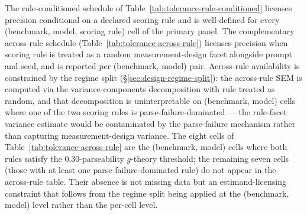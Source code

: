 \documentclass[11pt]{article}
\begin{document}
The rule-conditioned schedule of Table~\ref{tab:tolerance-rule-conditioned} licenses precision conditional on a declared scoring rule and is well-defined for every (benchmark, model, scoring rule) cell of the primary panel. The complementary across-rule schedule (Table~\ref{tab:tolerance-across-rule}) licenses precision when scoring rule is treated as a random measurement-design facet alongside prompt and seed, and is reported per (benchmark, model) pair. Across-rule availability is constrained by the regime split (§\ref{sec:design-regime-split}): the across-rule SEM is computed via the variance-components decomposition with rule treated as random, and that decomposition is uninterpretable on (benchmark, model) cells where one of the two scoring rules is parse-failure-dominated --- the rule-facet variance estimate would be contaminated by the parse-failure mechanism rather than capturing measurement-design variance. The eight cells of Table~\ref{tab:tolerance-across-rule} are the (benchmark, model) cells where both rules satisfy the $0.30$-parseability $g$-theory threshold; the remaining seven cells (those with at least one parse-failure-dominated rule) do not appear in the across-rule table. Their absence is not missing data but an estimand-licensing constraint that follows from the regime split being applied at the (benchmark, model) level rather than the per-cell level.
\end{document}
